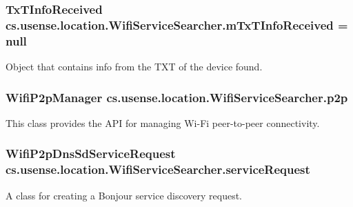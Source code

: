\subsubsection[{m\+Tx\+T\+Info\+Received}]{\setlength{\rightskip}{0pt plus 5cm}Tx\+T\+Info\+Received cs.\+usense.\+location.\+Wifi\+Service\+Searcher.\+m\+Tx\+T\+Info\+Received = null\hspace{0.3cm}{\ttfamily [private]}}\label{classcs_1_1usense_1_1location_1_1_wifi_service_searcher_ab640f7d28eadfc3075477a6f53673ff5}
Object that contains info from the T\+X\+T of the device found. \hypertarget{classcs_1_1usense_1_1location_1_1_wifi_service_searcher_a8d17c39ea9de1933345bb634effab869}{}
\subsubsection[{p2p}]{\setlength{\rightskip}{0pt plus 5cm}Wifi\+P2p\+Manager cs.\+usense.\+location.\+Wifi\+Service\+Searcher.\+p2p\hspace{0.3cm}{\ttfamily [private]}}\label{classcs_1_1usense_1_1location_1_1_wifi_service_searcher_a8d17c39ea9de1933345bb634effab869}
This class provides the A\+P\+I for managing Wi-\/\+Fi peer-\/to-\/peer connectivity. \hypertarget{classcs_1_1usense_1_1location_1_1_wifi_service_searcher_aa16ad4453cab09ab5d45b8b7e4bd59ad}{}
\subsubsection[{service\+Request}]{\setlength{\rightskip}{0pt plus 5cm}Wifi\+P2p\+Dns\+Sd\+Service\+Request cs.\+usense.\+location.\+Wifi\+Service\+Searcher.\+service\+Request\hspace{0.3cm}{\ttfamily [private]}}\label{classcs_1_1usense_1_1location_1_1_wifi_service_searcher_aa16ad4453cab09ab5d45b8b7e4bd59ad}
A class for creating a Bonjour service discovery request. \hypertarget{classcs_1_1usense_1_1location_1_1_wifi_service_searcher_a651b6e7c10fad3df5abb64b926094e06}{}
